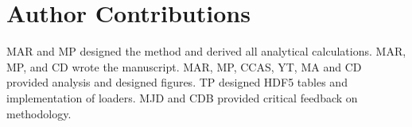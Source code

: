 % 
% 
% 
% 

\section*{Author Contributions}
MAR and MP designed the method and derived all analytical calculations. MAR, MP, and CD wrote the manuscript. MAR, MP, CCAS, YT, MA and CD provided analysis and designed figures. TP designed HDF5 tables and implementation of loaders. MJD and CDB provided critical feedback on methodology.

